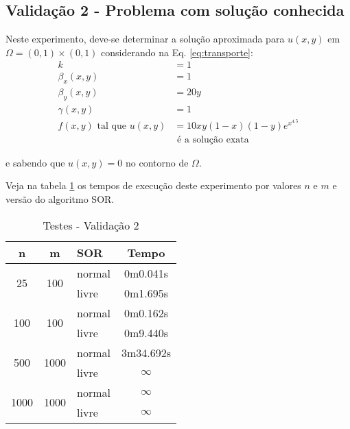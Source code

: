 \documentclass[
	11pt,				%
	oneside,			%
	a4paper,			%
	english,			%
	brazil,				%
	]{article}
\begin{document}
\subsection{Validação 2 - Problema com solução conhecida}
Neste experimento, deve-se determinar a solução aproximada para $u(x,y)$ em 
$\Omega = (0,1) \times (0,1)$ considerando na Eq.
\eqref{eq:transporte}:
\begin{align}\label{eq:v2}
k &= 1\nonumber \\
\beta_x(x,y) &= 1\nonumber \\
\beta_y(x,y) &= 20y\nonumber \\
\gamma(x,y) &= 1\nonumber \\
f(x,y) \text{ tal que } u(x,y) &= 10xy(1-x)(1-y)e^{x^{4.5}}\\
&\text{ é a solução exata }\nonumber
\end{align}

e sabendo que $u(x,y) = 0$ no contorno de $\Omega$.

Veja na tabela \ref{tab:tv2} os tempos de execução deste experimento por 
valores $n$ e $m$ e versão do algoritmo SOR.

\begin{table}[ht]
\centering
\begin{tabular}{|c|c|l|c|}
\hline 
\textbf{n} & \textbf{m} & \textbf{SOR} & \textbf{Tempo} \\
\hline
\multirow{2}{*}{25}    & \multirow{2}{*}{100}  & normal & 0m0.041s \\
                       &                       & livre  & 0m1.695s \\
\hline
\multirow{2}{*}{100}   & \multirow{2}{*}{100}  & normal & 0m0.162s \\
                       &                       & livre  & 0m9.440s \\
\hline
\multirow{2}{*}{500}   & \multirow{2}{*}{1000} & normal & 3m34.692s \\
                       &                       & livre  & $\infty$ \\
\hline
\multirow{2}{*}{1000}  & \multirow{2}{*}{1000} & normal & $\infty$ \\
                       &                       & livre  & $\infty$ \\
\hline
\end{tabular}
\caption{Testes - Validação 2}
\label{tab:tv2}
\end{table}
\end{document}
